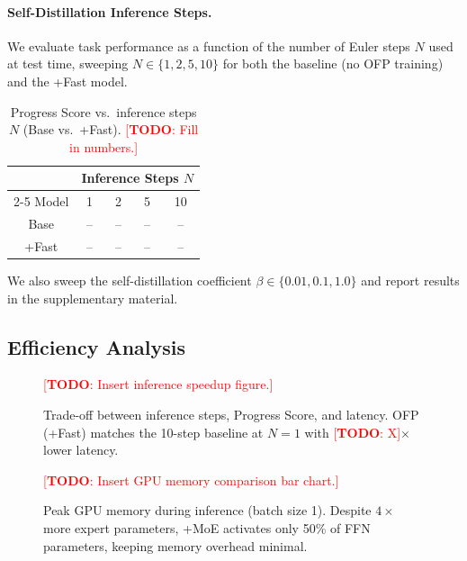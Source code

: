 \documentclass[10pt,twocolumn]{article}
\newcommand{\TODO}[1]{\textcolor{red}{[\textbf{TODO}: #1]}}
\begin{document}
\paragraph{Self-Distillation Inference Steps.}
We evaluate task performance as a function of the number of Euler steps $N$
used at test time, sweeping $N \in \{1, 2, 5, 10\}$ for both the baseline
(no OFP training) and the +Fast model.

\begin{table}[h]
  \centering
  \caption{Progress Score vs.\ inference steps $N$ (Base vs.\ +Fast).
    \TODO{Fill in numbers.}}
  \label{tab:abl_fast}
  \begin{tabular}{ccccc}
    \toprule
    & \multicolumn{4}{c}{Inference Steps $N$} \\
    \cmidrule(lr){2-5}
    Model & 1 & 2 & 5 & 10 \\
    \midrule
    Base  & -- & -- & -- & -- \\
    +Fast & -- & -- & -- & -- \\
    \bottomrule
  \end{tabular}
\end{table}

We also sweep the self-distillation coefficient $\beta \in \{0.01, 0.1, 1.0\}$
and report results in the supplementary material.


\subsection{Efficiency Analysis}
\label{sec:exp:eff}

\begin{figure}[t]
  \centering
  \TODO{Insert inference speedup figure.}
  \caption{Trade-off between inference steps, Progress Score, and latency.
    OFP (+Fast) matches the 10-step baseline at $N{=}1$ with
    \TODO{X}$\times$ lower latency.}
  \label{fig:speedup}
\end{figure}

\begin{figure}[t]
  \centering
  \TODO{Insert GPU memory comparison bar chart.}
  \caption{Peak GPU memory during inference (batch size 1).
    Despite $4\times$ more expert parameters, +MoE activates only
    50\% of FFN parameters, keeping memory overhead minimal.}
  \label{fig:memory}
\end{figure}
\end{document}
